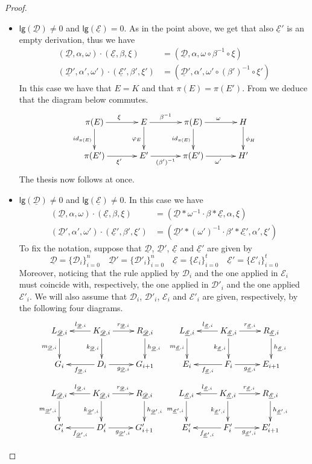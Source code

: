 \documentclass[a4paper,UKenglish,cleveref,pdftex, thm-restate,numberwithinsect]{lipics}
\newcommand{\id}[1]{\mathsf{id}_{#1}}
\newcommand{\dder}[1]{\mathscr{#1}}
\newcommand{\der}[1]{\underline{\dder{#1}}}
\newcommand{\lgh}[0]{\mathsf{lg}}
\begin{document}
\begin{proof}
\begin{itemize}
\item $\lgh(\der{D})\neq 0$ and $\lgh(\der{E})= 0$. As in the point above, we get that also $\der{E}'$  is an empty derivation, thus we have
\begin{align*}
	(\der{D}, \alpha, \omega)\cdot (\der{E}, \beta, \xi)&=(\der{D},  \alpha, \omega \circ \beta^{-1}\circ \xi)\\
	(\der{D}', \alpha', \omega')\cdot (\der{E}', \beta', \xi')&=(\der{D}',  \alpha', \omega' \circ (\beta')^{-1}\circ \xi')
\end{align*}
In this case we have that $E=K$ and that $\pi(E)=\pi(E')$. From  we deduce that the diagram below commutes.
\[\xymatrix@C=35pt{\pi(E) \ar[r]^{\xi} \ar[d]_{\id{\pi(E)}}& E  \ar[d]_{\varphi_E}\ar[r]^-{\beta^{-1}} & \pi(E) \ar[d]_{\id{\pi(E)}} \ar[r]^{\omega}& H \ar[d]^{\phi_H}\\\pi(E') \ar[r]_{\xi'}& E' \ar[r]_-{(\beta')^{-1}} & \pi(E') \ar[r]_{\omega'} & H'}\]
The thesis now follows at once.
	\item $\lgh(\der{D})\neq 0$ and $\lgh(\der{E})\neq 0$. In this case we have
	\begin{align*}
		(\der{D}, \alpha, \omega)\cdot (\der{E}, \beta, \xi)&=(\der{D}*\omega^{-1}\cdot \beta*\der{E}, \alpha, \xi)\\
		(\der{D}', \alpha', \omega')\cdot (\der{E}', \beta', \xi')&=(\der{D}'*(\omega')^{-1}\cdot \beta'*\der{E'}, \alpha', \xi')
	\end{align*}
 To fix the notation, suppose that $\der{D}$, $\der{D}'$, $\der{E}$ and $\der{E}'$ are given by
	\[\der{D}=\{\dder{D}_i\}_{i=0}^n \quad \der{D}'=\{\dder{D}'_i\}_{i=0}^n \quad \der{E}=\{\dder{E}_i\}_{i=0}^t \quad \der{E}'=\{\dder{E}'_i\}_{i=0}^t\]
	Moreover, noticing that the rule applied by $\dder{D}_i$ and the one applied in $\mathcal{E}_i$  must coincide with, respectively, the one applied in $\dder{D}'_i$ and the one applied $\dder{E}'_i$. We will also assume that $\dder{D}_i$, $\dder{D}'_i$, $\dder{E}_i$ and $\dder{E}'_i$ are given, respectively, by the following four diagrams. 
	\[\xymatrix{L_{\der{D},i} \ar[d]_{m_{\der{D}, i}}& K_{\der{D},i} \ar[d]_{k_{\der{D}, i}} \ar[r]^{r_{\der{D},i}} \ar[l]_{l_{\der{D},i}} & R_{\der{D},i}\ar[d]^{h_{\der{D}, i}} &L_{\der{E},i} \ar[d]_{m_{\der{E}, i}}& K_{\der{E},i} \ar[d]_{k_{\der{E}, i}} \ar[r]^{r_{\der{E},i}} \ar[l]_{l_{\der{E},i}} & R_{\der{E},i}\ar[d]^{h_{\der{E}, i}} \\G_i & D_i \ar[r]_{g_{\der{D},i}} \ar[l]^{f_{\der{D},i}} & G_{i+1} & E_i & F_i\ar[r]_{g_{\der{E},i}} \ar[l]^{f_{\der{E},i}}  & E_{i+1}}\]
	\[\xymatrix{L_{\der{D},i} \ar[d]_{m_{\der{D}', i}}& K_{\der{D},i} \ar[d]_{k_{\der{D}', i}} \ar[r]^{r_{\der{D},i}} \ar[l]_{l_{\der{D},i}} & R_{\der{D},i}\ar[d]^{h_{\der{D}', i}} &L_{\der{E},i} \ar[d]_{m_{\der{E}', i}}& K_{\der{E},i} \ar[d]_{k_{\der{E}', i}} \ar[r]^{r_{\der{E},i}} \ar[l]_{l_{\der{E},i}} & R_{\der{E},i}\ar[d]^{h_{\der{E}', i}} \\G'_i & D'_i \ar[r]_{g_{\der{D}',i}} \ar[l]^{f_{\der{D}',i}} & G'_{i+1} & E'_i & F'_i\ar[r]_{g_{\der{E}',i}} \ar[l]^{f_{\der{E}',i}}  & E'_{i+1}}\]
	

\end{itemize}
\end{proof}
\end{document}
